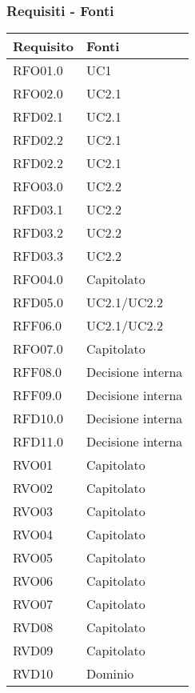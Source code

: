 \subsubsection{Requisiti - Fonti}
{
    \setlength{\freewidth}{\dimexpr\textwidth-8\tabcolsep}
    \renewcommand{\arraystretch}{1.5}
    \centering
    \setlength{\aboverulesep}{0pt}
    \setlength{\belowrulesep}{0pt}
    \begin{longtable}{C{.50\freewidth} C{.50\freewidth}}
        \toprule 
        \textbf{Requisito} & \textbf{Fonti} \\
        \toprule
        \endhead

        RFO01.0  & UC1 \\
        RFO02.0  & UC2.1 \\
        RFD02.1  & UC2.1 \\
        RFD02.2  & UC2.1 \\
        RFD02.2  & UC2.1 \\
        RFO03.0  & UC2.2 \\
        RFD03.1  & UC2.2 \\
        RFD03.2  & UC2.2 \\
        RFD03.3  & UC2.2 \\
        RFO04.0  & Capitolato \\
        RFD05.0  & UC2.1/UC2.2 \\
        RFF06.0  & UC2.1/UC2.2 \\
        RFO07.0  & Capitolato \\
        RFF08.0  & Decisione interna \\
        RFF09.0  & Decisione interna \\
        RFD10.0  & Decisione interna \\
        RFD11.0  & Decisione interna \\

        RVO01    & Capitolato \\
        RVO02    & Capitolato \\
        RVO03    & Capitolato \\
        RVO04    & Capitolato \\
        RVO05    & Capitolato \\
        RVO06    & Capitolato \\
        RVO07    & Capitolato \\
        RVD08    & Capitolato \\
        RVD09    & Capitolato \\
        RVD10    & Dominio \\


\end{longtable}}
